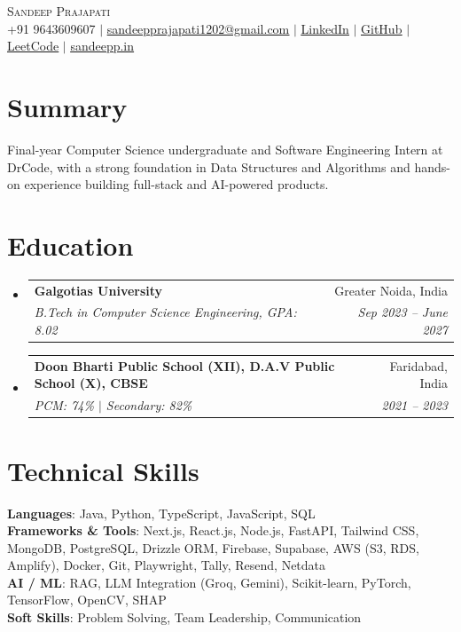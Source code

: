 \documentclass[letterpaper,10pt]{article}
\makeatletter
\newcommand{\resumeSubheading}[4]{
  \item
    \begin{tabular*}{\textwidth}[t]{l@{\extracolsep{\fill}}r}
      \textbf{#1} & \small #2 \\
      \textit{\small#3} & \textit{\small #4} \\
    \end{tabular*}\vspace{-2pt}
}
\newcommand{\resumeSubHeadingListStart}{\begin{itemize}[leftmargin=0.15in, label={}, itemsep=1pt, parsep=0pt, topsep=0pt, partopsep=0pt]}
\newcommand{\resumeSubHeadingListEnd}{\end{itemize}}
\makeatother
\begin{document}
\begin{center}
    {\Huge \scshape Sandeep Prajapati} \\ \vspace{4pt}
    \small +91 9643609607 $|$
    \href{mailto:sandeepprajapati1202@gmail.com}{\underline{sandeepprajapati1202@gmail.com}} $|$
    \href{https://www.linkedin.com/in/simplysandeepp}{\underline{LinkedIn}} $|$
    \href{https://github.com/simplysandeepp}{\underline{GitHub}} $|$
    \href{https://www.leetcode.com/u/simplysandeepp}{\underline{LeetCode}} $|$
    \href{https://www.sandeepp.in}{\underline{sandeepp.in}}
\end{center}

\section{Summary}
\small Final-year Computer Science undergraduate and Software Engineering Intern at DrCode, with a strong foundation in Data Structures and Algorithms and hands-on experience building full-stack and AI-powered products.

\section{Education}
  \resumeSubHeadingListStart
    \resumeSubheading
      {Galgotias University}{Greater Noida, India}
      {B.Tech in Computer Science Engineering, GPA: 8.02}{Sep 2023 -- June 2027}
    \resumeSubheading
      {Doon Bharti Public School (XII), D.A.V Public School (X), CBSE}{Faridabad, India}
      {PCM: 74\% $|$ Secondary: 82\%}{2021 -- 2023}
  \resumeSubHeadingListEnd

\section{Technical Skills}
 \begin{itemize}[leftmargin=0.15in, label={}, itemsep=0pt, parsep=0pt, topsep=0pt]
    \small{\item{
     \textbf{Languages}{: Java, Python, TypeScript, JavaScript, SQL} \\
     \textbf{Frameworks \& Tools}{: Next.js, React.js, Node.js, FastAPI, Tailwind CSS, MongoDB, PostgreSQL, Drizzle ORM, Firebase, Supabase, AWS (S3, RDS, Amplify), Docker, Git, Playwright, Tally, Resend, Netdata} \\
     \textbf{AI / ML}{: RAG, LLM Integration (Groq, Gemini), Scikit-learn, PyTorch, TensorFlow, OpenCV, SHAP} \\
     \textbf{Soft Skills}{: Problem Solving, Team Leadership, Communication}
    }}
 \end{itemize}
\end{document}
